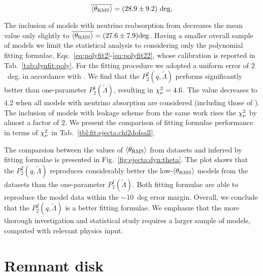 \begin{equation}
\overline{\langle\theta_{\rm RMS}\rangle} = (28.9 \pm 9.2)~\text{deg},
\end{equation}

The inclusion of models with neutrino reabsorption from \citet{Radice:2018pdn} decreases the mean
value only slightly to $\overline{\langle\theta_{\rm RMS}\rangle}=(27.6 \pm 7.9) \text{deg}$.
Having a smaller overall sample of models we limit the statistical analysis to considering 
only the polynomial fitting formulae, Eqs.~\eqref{eq:polyfit2}-\eqref{eq:polyfit22}, whose 
calibration is reported in Tab.~\ref{tab:dynfit:poly}.
For the fitting procedure we adopted a uniform error of $2$~deg. in accordance with
\citet{Radice:2018pdn}.
We find that the $P_2^2(q,\tilde\Lambda)$ performs significantly better than one-parameter 
$P_2^1(\tilde\Lambda)$, resulting in $\chi_{\nu}^2=4.6$. The value decreases to $4.2$ when all models 
with neutrino absorption are considered (including those of \citet{Radice:2018pdn}).
The inclusion of models with leakage scheme from the same work rises the $\chi_{\nu}^2$ by almost 
a factor of $2$.
We present the comparison of fitting formulae performance in terms of $\chi_{\nu}^2$ in 
Tab.~\ref{tbl:fit:ejecta:chi2dofsall}.

The comparsion between the values of $\langle\theta_{\rm RMS}\rangle$ from datasets and inferred by 
fitting formulae is presented in Fig.~\ref{fig:ejecta:dyn:theta}.
The plot shows that the $P_2^2(q,\tilde{\Lambda})$ reproduces considerably better 
the low-$\langle\theta_{\rm RMS}\rangle$ models from the datasets than the one-parameter $P_2^1(\tilde{\Lambda})$.
Both fitting formulae are able to reproduce the model data within the $\sim 10$~deg
error margin.
Overall, we conclude that the $P_2^2(q,\tilde{\Lambda})$ is a better fitting formulae.
We emphasze that the more thorough investigation and statistical study requires a larger 
sample of models, computed with relevant physics input.


\section{Remnant disk}
\label{sec:remdisk}

